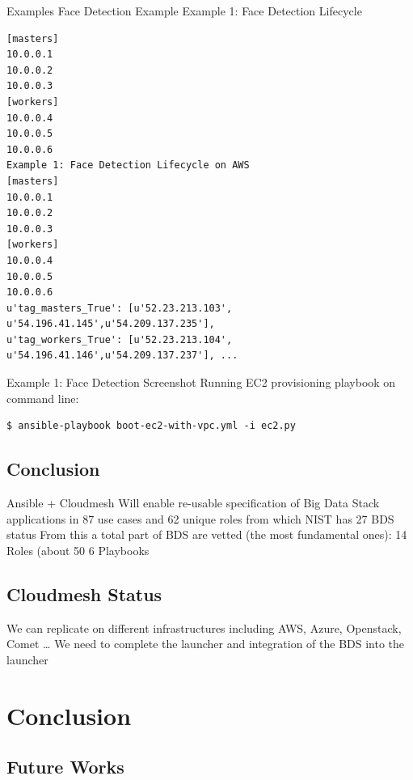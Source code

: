Examples
Face Detection Example
Example 1: Face Detection Lifecycle
\begin{Verbatim}
[masters]
10.0.0.1
10.0.0.2
10.0.0.3
[workers]
10.0.0.4
10.0.0.5
10.0.0.6
Example 1: Face Detection Lifecycle on AWS
[masters]
10.0.0.1
10.0.0.2
10.0.0.3
[workers]
10.0.0.4
10.0.0.5
10.0.0.6
u'tag_masters_True': [u'52.23.213.103', u'54.196.41.145',u'54.209.137.235'],
u'tag_workers_True': [u'52.23.213.104', u'54.196.41.146',u'54.209.137.237'], ...
\end{Verbatim}

Example 1: Face Detection Screenshot Running EC2 provisioning playbook
on command line:

\begin{Verbatim}
$ ansible-playbook boot-ec2-with-vpc.yml -i ec2.py
\end{Verbatim}

\subsection{Conclusion}
Ansible + Cloudmesh
Will enable re-usable specification of Big Data Stack applications in 87 use cases and 62 unique roles from which NIST has 27
BDS status
From this a total part of BDS are vetted (the most fundamental ones): 
14 Roles  (about 50%
6   Playbooks

\subsection{Cloudmesh Status}
We can replicate on different infrastructures including AWS, Azure, Openstack, Comet …
We need to complete the launcher and integration of the BDS into the launcher







\section{Conclusion}


\subsection{Future Works}



